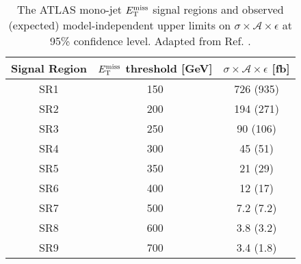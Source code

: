 \begin{table}[!htbp]
\centering
\begin{tabular}{c|c|c}
 \hline
 \hline
 Signal Region & $E_{\mathrm{T}}^{\mathrm{miss}}$ threshold [GeV] & $\sigma \times \mathcal{A} \times \epsilon$ [fb] \\ %
 \hline
 SR1 & 150 & 726 (935) \\ %
 SR2 & 200 & 194 (271) \\ %
 SR3 & 250 & 90 (106) \\ %
 SR4 & 300 & 45 (51) \\ %
 SR5 & 350 & 21 (29) \\ %
 SR6 & 400 & 12 (17) \\ %
 SR7 & 500 & 7.2 (7.2) \\ %
 SR8 & 600 & 3.8 (3.2) \\ %
 SR9 & 700 & 3.4 (1.8) \\ %
 \hline
 \hline
\end{tabular}
\caption{The ATLAS mono-jet $E_{\mathrm{T}}^{\mathrm{miss}}$ signal regions and  observed (expected) model-independent upper limits on $\sigma \times \mathcal{A} \times \epsilon$ at 95\% confidence level. Adapted from Ref. \cite{Aad:2015zva}.
}
\label{monojet_SRs}
\end{table}


